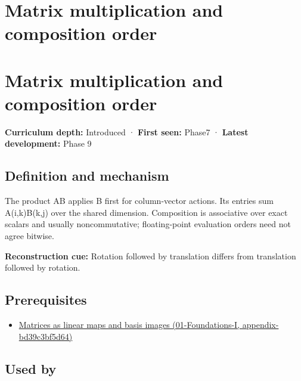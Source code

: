 \hypertarget{appendix-ab31ef447dbf}{}
\section*{Matrix multiplication and composition order}
\section{Matrix multiplication and composition order}\label{matrix-multiplication-and-composition-order}

\textbf{Curriculum depth:} Introduced · \textbf{First seen:} Phase7 · \textbf{Latest development:} Phase 9

\subsection{Definition and mechanism}\label{definition-and-mechanism}

The product AB applies B first for column-vector actions. Its entries sum A(i,k)B(k,j) over the shared dimension. Composition is associative over exact scalars and usually noncommutative; floating-point evaluation orders need not agree bitwise.

\textbf{Reconstruction cue:} Rotation followed by translation differs from translation followed by rotation.

\subsection{Prerequisites}\label{prerequisites}

\begin{itemize}
\tightlist
\item
  \href{}{Matrices as linear maps and basis images (01-Foundations-I, appendix-bd39c3bf5d64)}
\end{itemize}

\subsection{Used by}\label{used-by}

